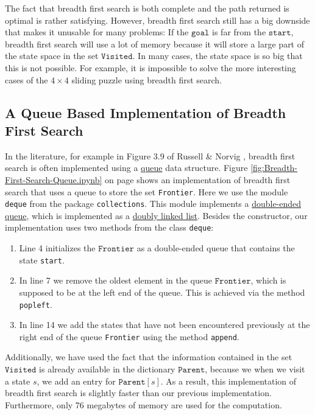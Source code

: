 The fact that breadth first search is both complete and the path returned is optimal is rather
satisfying.  However, breadth first search still has a big downside that makes it unusable for
many problems:  If the $\texttt{goal}$ is far from the $\texttt{start}$, breadth first search will use
a lot of memory because it will store a large part of the state space in the set
$\texttt{Visited}$.  In many cases, the state space is so big that this is not possible.  For example, it is
impossible to solve the more interesting cases of the $4 \times 4$ sliding puzzle using breadth first search.

\subsection{A Queue Based Implementation of Breadth First Search}
In the literature, for example in Figure 3.9 of Russell \& Norvig \cite{russell:2020}, breadth
first search is often implemented using a
\href{https://en.wikipedia.org/wiki/Queue_(abstract_data_type)}{queue} data structure.
Figure \ref{fig:Breadth-First-Search-Queue.ipynb} on page
\pageref{fig:Breadth-First-Search-Queue.ipynb} shows an implementation of breadth first search that
uses a queue to store the set \texttt{Frontier}.   Here we use the module \texttt{deque} from the package
\texttt{collections}. This module implements a
\href{https://en.wikipedia.org/wiki/Double-ended_queue}{double-ended queue}, 
which is implemented as a 
\href{https://en.wikipedia.org/wiki/Doubly_linked_list}{doubly linked list}. 
Besides the constructor, our
implementation uses two methods from the class \texttt{deque}:
\begin{enumerate}
\item Line 4 initializes the $\texttt{Frontier}$ as a double-ended queue that contains the state \texttt{start}.
\item In line 7 we remove the oldest element in the queue $\texttt{Frontier}$, which is supposed to be at the
      left end of the queue.  This is achieved via the method \texttt{popleft}.
\item In line 14 we add the states that have not been encountered previously at the right end of the queue
      \texttt{Frontier} using the method \texttt{append}.
\end{enumerate}
Additionally, we have used the fact that the information contained in the set $\texttt{Visited}$ is already
available in the dictionary $\texttt{Parent}$, because we when we visit a state $s$, we add an entry for
$\mathtt{Parent}[s]$.  As a result, this implementation of breadth first search is slightly faster than our
previous implementation.  Furthermore, only 76 megabytes of memory are used for the computation.

